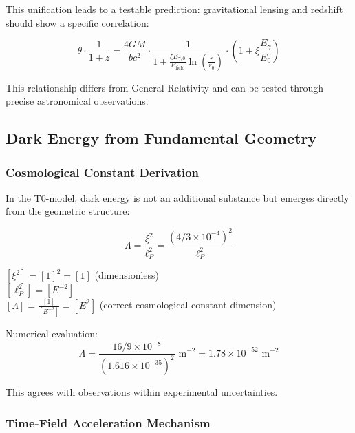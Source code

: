 \documentclass[12pt,a4paper]{article}
\theoremstyle{definition}
\begin{document}
This unification leads to a testable prediction: gravitational lensing and redshift should show a specific correlation:

\begin{equation}
	\theta \cdot \frac{1}{1+z} = \frac{4GM}{bc^2} \cdot \frac{1}{1 + \frac{\xi E_{\gamma,0}}{E_{\text{field}}} \ln\left(\frac{r}{r_0}\right)} \cdot \left(1 + \xi \frac{E_\gamma}{E_0}\right)
\end{equation}

This relationship differs from General Relativity and can be tested through precise astronomical observations.

\subsection{Dark Energy from Fundamental Geometry}

\subsubsection{Cosmological Constant Derivation}

In the T0-model, dark energy is not an additional substance but emerges directly from the geometric structure:

\begin{equation}
	\boxed{\Lambda = \frac{\xi^2}{\ell_P^2} = \frac{(4/3 \times 10^{-4})^2}{\ell_P^2}}
\end{equation}

\begin{einheitencheck}
	$[\xi^2] = [1]^2 = [1]$ (dimensionless) \checkmark\\
	$[\ell_P^2] = [E^{-2}]$ \checkmark\\
	$[\Lambda] = \frac{[1]}{[E^{-2}]} = [E^2]$ (correct cosmological constant dimension) \checkmark
\end{einheitencheck}

Numerical evaluation:
\begin{equation}
	\Lambda = \frac{16/9 \times 10^{-8}}{(1.616 \times 10^{-35})^2} \text{ m}^{-2} = 1.78 \times 10^{-52} \text{ m}^{-2}
\end{equation}

This agrees with observations within experimental uncertainties.

\subsubsection{Time-Field Acceleration Mechanism}
\end{document}
